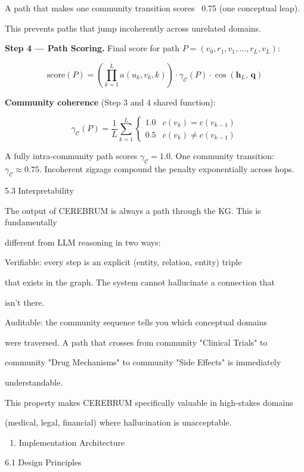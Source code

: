 \documentclass[10pt,journal,compsoc]{IEEEtran}
\begin{document}
A path that makes one community transition scores ~0.75 (one conceptual leap).

This prevents paths that jump incoh\-erently across unrelated domains.

\textbf{Step 4 — Path Scoring.} Final score for path $P = (v_0, r_1, v_1, \ldots, r_L, v_L)$:

\begin{equation}
\mathrm{score}(P) = \left(\prod_{k=1}^{L} a(u_k, v_k, k)\right) \cdot \gamma_{\mathcal{C}}(P) \cdot \cos\!\left(\mathbf{h}_L,\, \mathbf{q}\right)
\end{equation}

\textbf{Community coherence} (Step 3 and 4 shared function):

\begin{equation}
\gamma_{\mathcal{C}}(P) = \frac{1}{L}\sum_{k=1}^{L} \begin{cases} 1.0 & c(v_k) = c(v_{k-1}) \\ 0.5 & c(v_k) \neq c(v_{k-1}) \end{cases}
\end{equation}

A fully intra-community path scores $\gamma_{\mathcal{C}} = 1.0$. One community transition: $\gamma_{\mathcal{C}} \approx 0.75$. Incoherent zigzags compound the penalty expon\-entially across hops.

5.3 Interp\-retability

The output of CEREBRUM is always a path through the KG. This is funda\-mentally

different from LLM reasoning in two ways:

Verifiable: every step is an explicit (entity, relation, entity) triple

that exists in the graph. The system cannot hallucinate a connection that

isn't there.

Auditable: the community sequence tells you which conceptual domains

were traversed. A path that crosses from community "Clinical Trials" to

community "Drug Mechanisms" to community "Side Effects" is immediately

under\-standable.

This property makes CEREBRUM speci\-fically valuable in high-stakes domains

(medical, legal, financial) where hallu\-cination is unacc\-eptable.

\begin{enumerate}
\item Implem\-entation Archit\-ecture

\end{enumerate}
6.1 Design Principles
\end{document}
